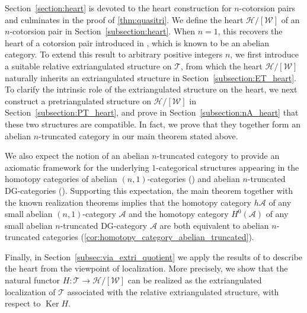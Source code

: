 \documentclass[a4paper,reqno,10pt]{amsart}
\theoremstyle{definition}
\theoremstyle{definition}
\theoremstyle{definition}
\theoremstyle{definition}
\theoremstyle{plain}
\newcommand{\Ker}{\operatorname{Ker}}
\newcommand{\CH}{\mathcal{H}}
\newcommand{\CT}{\mathcal{T}}
\newcommand{\CW}{\mathcal{W}}
\newcommand{\A}{\mathscr{A}}
\begin{document}
Section~\ref{section:heart} is devoted to the heart construction for $n$-cotorsion pairs and culminates in the proof of \cref{thm:quasitri}.
We define the heart $\CH/[\CW]$ of an $n$-cotorsion pair in Section~\ref{subsection:heart}.
When $n=1$, this recovers the heart of a cotorsion pair introduced in \cite{Nak11}, which is known to be an abelian category.
To extend this result to arbitrary positive integers $n$, we first introduce a suitable relative extriangulated structure on $\CT$, from which the heart $\CH/[\CW]$ naturally inherits an extriangulated structure in Section~\ref{subsection:ET_heart}.
To clarify the intrinsic role of the extriangulated structure on the heart, we next construct a pretriangulated structure on $\CH/[\CW]$ in Section~\ref{subsection:PT_heart}, and prove in Section~\ref{subsection:nA_heart} that these two structures are compatible.
In fact, we prove that they together form an abelian $n$-truncated category in our main theorem stated above.

We also expect the notion of an abelian $n$-truncated category to provide an axiomatic framework for the underlying $1$-categorical structures appearing in the homotopy categories of abelian $(n,1)$-categories (\cite[Definition~6.2.4]{Ste23}) and abelian $n$-truncated DG-categories (\cite[Definition~3.12]{Moc25}).
Supporting this expectation, the main theorem together with the known realization theorems implies that the homotopy category $h\mathcal{A}$ of any small abelian $(n,1)$-category $\mathcal{A}$ and the homotopy category $H^0(\A)$ of any small abelian $n$-truncated DG-category $\A$ are both equivalent to abelian $n$-truncated categories (\cref{cor:homotopy_category_abelian_truncated}).

Finally, in Section~\ref{subsec:via_extri_quotient} we apply the results of \cite{Oga24} to describe the heart from the viewpoint of localization.
More precisely, we show that the natural functor $H\colon \CT\to\CH/[\CW]$ can be realized as the extriangulated localization of $\CT$ associated with the relative extriangulated structure, with respect to $\Ker H$.
\bigskip

\normalcolor
\end{document}
